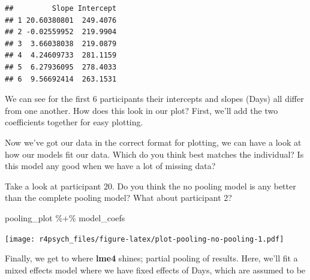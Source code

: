 \documentclass[
]{book}
\newenvironment{Shaded}{\begin{snugshade}}{\end{snugshade}}
\newcommand{\AttributeTok}[1]{\textcolor[rgb]{0.77,0.63,0.00}{#1}}
\newcommand{\DecValTok}[1]{\textcolor[rgb]{0.00,0.00,0.81}{#1}}
\newcommand{\FunctionTok}[1]{\textcolor[rgb]{0.00,0.00,0.00}{#1}}
\newcommand{\NormalTok}[1]{#1}
\newcommand{\OtherTok}[1]{\textcolor[rgb]{0.56,0.35,0.01}{#1}}
\newcommand{\SpecialCharTok}[1]{\textcolor[rgb]{0.00,0.00,0.00}{#1}}
\newcommand{\StringTok}[1]{\textcolor[rgb]{0.31,0.60,0.02}{#1}}
\begin{document}
\begin{verbatim}
##         Slope Intercept
## 1 20.60380801  249.4076
## 2 -0.02559952  219.9904
## 3  3.66038038  219.0879
## 4  4.24609733  281.1159
## 5  6.27936095  278.4033
## 6  9.56692414  263.1531
\end{verbatim}

We can see for the first 6 participants their intercepts and slopes (Days) all differ from one another. How does this look in our plot? First, we'll add the two coefficients together for easy plotting.

\begin{Shaded}
\end{Shaded}

Now we've got our data in the correct format for plotting, we can have a look at how our models fit our data. Which do you think best matches the individual? Is this model any good when we have a lot of missing data?

Take a look at participant 20. Do you think the no pooling model is any better than the complete pooling model? What about participant 2?

\begin{Shaded}
\begin{Highlighting}[]
\NormalTok{pooling\_plot }\SpecialCharTok{\%+\%}\NormalTok{ model\_coefs}
\end{Highlighting}
\end{Shaded}

\texttt{[image: r4psych\_files/figure-latex/plot-pooling-no-pooling-1.pdf]}

Finally, we get to where \textbf{lme4} shines; partial pooling of results. Here, we'll fit a mixed effects model where we have fixed effects of Days, which are assumed to be
\end{document}
